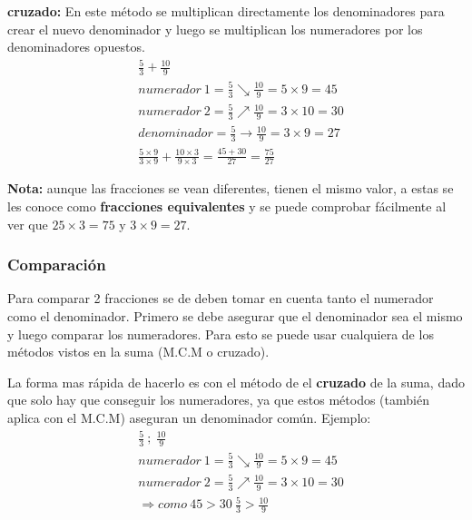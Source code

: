 \documentclass[12pt]{article}
\begin{document}
\begin{itemize}
            \textbf{cruzado:}
            En este método se multiplican directamente los denominadores para
            crear el nuevo denominador y luego se multiplican los  numeradores por
            los denominadores opuestos.
            \begin{align*}
                &\frac{5}{3} + \frac{10}{9}\\
                &numerador\ 1 = \frac{5}{3} \searrow \frac{10}{9} = 5\times9 = 45\\
                &numerador\ 2 = \frac{5}{3}  \nearrow \frac{10}{9} = 3\times10 = 30\\
                &denominador = \frac{5}{3} \rightarrow \frac{10}{9} = 3\times9 = 27\\
                &\frac{5\times9}{3\times9} + \frac{10\times3}{9\times3} = \frac{45+30}{27} = \frac{75}{27}
            \end{align*}

            \textbf{Nota:} aunque las fracciones se vean diferentes, tienen el mismo
            valor, a estas se les conoce como \textbf{fracciones equivalentes}
            y se puede comprobar fácilmente al ver que $25\times3=75$ y $3\times9=27$.
    \end{itemize}

\subsubsection*{Comparación}\label{comparación}

    Para comparar 2 fracciones se de deben tomar en cuenta tanto el numerador como
    el denominador. Primero se debe asegurar que el denominador sea el mismo y
    luego comparar los numeradores. Para esto se puede usar cualquiera de los
    métodos vistos en la suma (M.C.M o cruzado).

    La forma mas rápida de hacerlo es con el método de el \textbf{cruzado} de
    la suma, dado que solo hay que conseguir los numeradores, ya que estos métodos
    (también aplica con el M.C.M) aseguran un denominador  común. Ejemplo:
        \begin{align*}
            &\frac{5}{3}\ ;\ \frac{10}{9}\\
            &numerador\ 1 = \frac{5}{3} \searrow \frac{10}{9} = 5\times9 = 45\\
            &numerador\ 2 = \frac{5}{3}  \nearrow \frac{10}{9} = 3\times10 = 30\\
            &\Rightarrow como\ 45>30\ \frac{5}{3} > \frac{10}{9}
        \end{align*}
\end{document}
